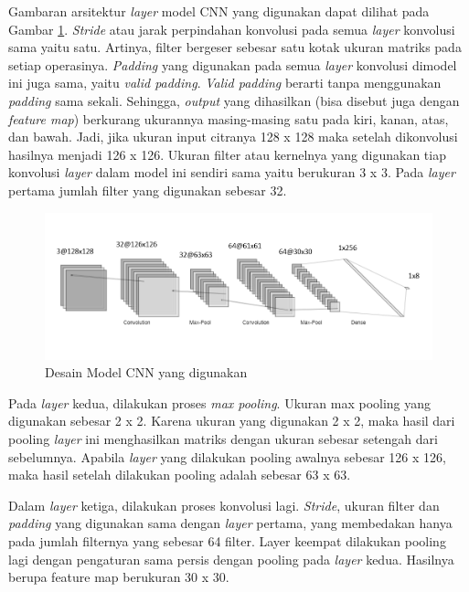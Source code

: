 Gambaran arsitektur \emph{layer} model CNN yang digunakan dapat dilihat pada Gambar \ref{fig:cnnlayer}. \emph{Stride} atau jarak perpindahan konvolusi pada semua \emph{layer} konvolusi sama yaitu satu. Artinya, filter bergeser sebesar satu kotak ukuran matriks pada setiap operasinya. \emph{Padding} yang digunakan pada semua \emph{layer} konvolusi dimodel ini juga sama, yaitu \emph{valid padding}. \emph{Valid padding} berarti tanpa menggunakan \emph{padding} sama sekali. Sehingga, \emph{output} yang dihasilkan (bisa disebut juga dengan \emph{feature map}) berkurang ukurannya masing-masing satu pada kiri, kanan, atas, dan bawah. Jadi, jika ukuran input citranya 128 x 128 maka setelah dikonvolusi hasilnya menjadi 126 x 126. Ukuran filter atau kernelnya yang digunakan tiap konvolusi \emph{layer} dalam model ini sendiri sama yaitu berukuran 3 x 3. Pada \emph{layer} pertama jumlah filter yang digunakan sebesar 32. 

\begin{figure} [ht]
  \centering
  \includegraphics[scale=0.75]{gambar/cnn-layer.png}
  \caption{Desain Model CNN yang digunakan}
  \label{fig:cnnlayer}
\end{figure}

Pada \emph{layer} kedua, dilakukan proses \emph{max pooling}. Ukuran max pooling yang digunakan sebesar 2 x 2. Karena ukuran yang digunakan 2 x 2, maka hasil dari pooling \emph{layer} ini menghasilkan matriks dengan ukuran sebesar setengah dari sebelumnya. Apabila \emph{layer} yang dilakukan pooling awalnya sebesar 126 x 126, maka hasil setelah dilakukan pooling adalah sebesar 63 x 63.

Dalam \emph{layer} ketiga, dilakukan proses konvolusi lagi. \emph{Stride}, ukuran filter dan \emph{padding} yang digunakan sama dengan \emph{layer} pertama, yang membedakan hanya pada jumlah filternya yang sebesar 64 filter. Layer keempat dilakukan pooling lagi dengan pengaturan sama persis dengan pooling pada \emph{layer} kedua. Hasilnya berupa feature map berukuran 30 x 30.


